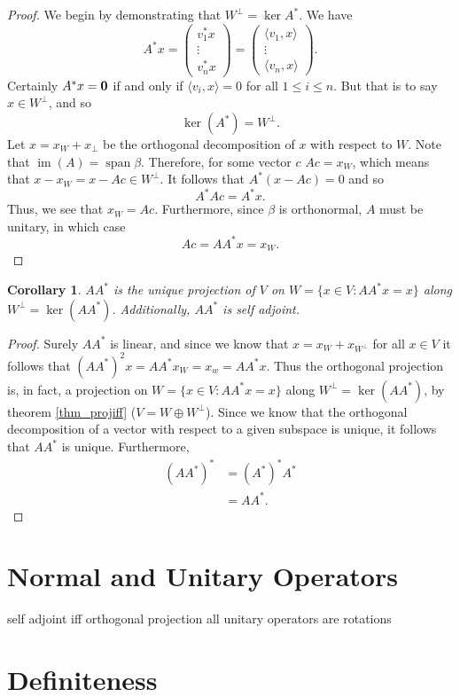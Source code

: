 \documentclass[oneside, 12pt]{book}
\DeclareMathOperator{\spn}{span}
\DeclareMathOperator{\im}{im}
\newtheorem{cor}{Corollary}[section]
\theoremstyle{definition}
\begin{document}
\begin{proof}
  We begin by demonstrating that $W^{\perp}=\ker A^{*}$. We have
  \[A^{*}x= \begin{pmatrix}v_{1}^{*}x \\ \vdots \\ v_{n}^{*}x \end{pmatrix}=\begin{pmatrix}\langle v_{1}, x \rangle \\  \vdots \\ \langle v_{n}, x \rangle\end{pmatrix}.\] Certainly
  $A^{*}x=\bold{0}$ if and only if $\langle v_{i}, x \rangle=0$ for all $1 \leq i \leq n$. But that is to say $x \in W^{\perp}$, and so \[\ker(A^{*})=W^{\perp}.\]
  Let $x=x_{W}+x_{\perp}$ be the orthogonal decomposition of $x$ with respect to $W$.
  Note that $\im(A)=\spn\beta$. Therefore, for some vector $c$ $Ac=x_{W}$, which means that $x-x_{W}=x-Ac \in W^{\perp}$. It follows that
  $A^{*}(x-Ac)=0$ and so \[A^{*}Ac=A^{*}x.\] Thus, we see that $x_{W}=Ac$. Furthermore, since $\beta$ is orthonormal, $A$ must be unitary, in which case \[Ac=AA^{*}x=x_{W}.\]
\end{proof}
\begin{cor}
  \label{cor_orthproj}
$AA^{*}$ is the unique projection of $V$ on $W=\{x \in V: AA^{*}x=x\}$ along $W^{\perp}=\ker(AA^{*})$. Additionally, $AA^{*}$ is self adjoint.
\end{cor}
\begin{proof}
  Surely $AA^{*}$ is linear, and since we know that $x=x_{W}+x_{W^{\perp}}$ for all $x \in V$ it follows that $(AA^{*})^{2}x=AA^{*}x_{W}=x_{w}=AA^{*}x$. Thus the orthogonal projection is, in fact, a projection on $W=\{x \in V: AA^{*}x=x \}$ along $W^{\perp}=\ker(AA^{*})$, by theorem \ref{thm_projiff} ($V=W \oplus W^{\perp}$). Since we know that the orthogonal decomposition of a vector with respect to a given subspace is unique, it follows that $AA^{*}$ is unique.
  Furthermore,
  \begin{align}
    (AA^{*})^{*}&=(A^{*})^{*}A^{*} \\
    &=AA^{*}.
  \end{align}
\end{proof}
\section{Normal and Unitary Operators}
self adjoint iff orthogonal projection
all unitary operators are rotations
\section{Definiteness}
\end{document}
